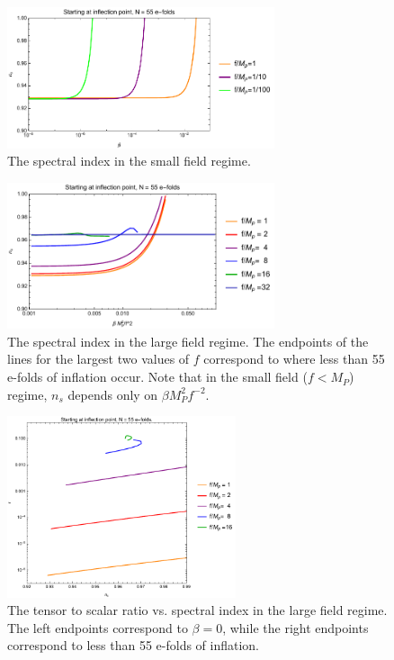 \documentclass[aps,amsfonts,amsmath,prd,preprint,nofootinbib,superscriptaddress]{revtex4}
\newcommand{\Mp}{{M_{P}}}
\newcommand{\MMp}{{M_P^2}}
\begin{document}
\begin{figure}[!h]
  \centering
    \includegraphics[width=0.7\textwidth]{figures/nsvsbetaplot2.pdf}
    \caption{The spectral index in the small field regime.}
\end{figure}

\begin{figure}[!h]
  \centering
    \includegraphics[width=0.7\textwidth]{figures/nsvsb.pdf}
    \caption{The spectral index in the large field regime. The endpoints of the lines for the largest two values of $f$ correspond to where less than 55 e-folds of inflation occur.
    Note that in the small field ($f < \Mp$) regime, $n_s$ depends only on $\beta \MMp f^{-2}$.}
\end{figure}

\begin{figure}[!h]
  \centering
    \includegraphics[width=0.6\textwidth]{figures/nsrplotvsf.pdf}
    \caption{The tensor to scalar ratio vs. spectral index in the large field regime.  The left endpoints correspond to $\beta = 0$, while the right endpoints correspond to less than 55 e-folds of inflation.}
\end{figure}
\end{document}
